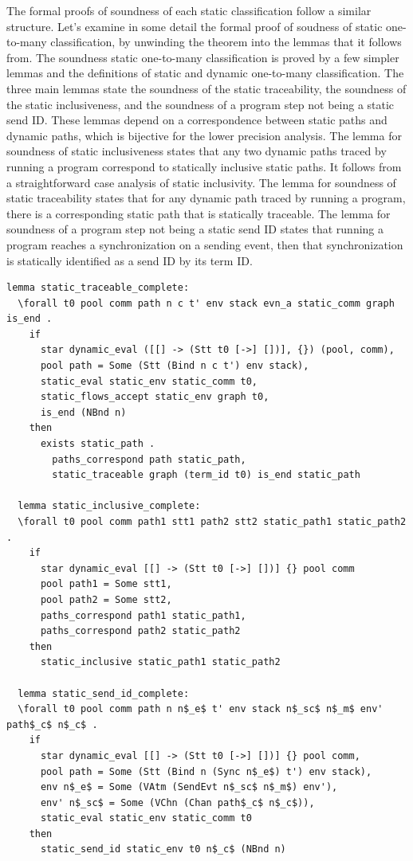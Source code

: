 \documentclass[10pt]{article}
\begin{document}
The formal proofs of soundness of each static classification follow a similar structure.
Let's examine in some detail the formal proof of soudness of static one-to-many classification,
by unwinding the theorem into the lemmas that it follows from.
The soundness static one-to-many classification is proved by a few simpler lemmas and the
definitions of static and dynamic one-to-many classification.  The three main lemmas state the
soundness of the static traceability, the soundness of the static inclusiveness, and
the soundness of a program step not being a static send ID. These lemmas depend on a
correspondence between static paths and dynamic paths, which is bijective for the lower
precision analysis. The lemma for soundness of static inclusiveness states that any two
dynamic paths traced by running a program correspond to statically inclusive static paths. It
follows from a straightforward case analysis of static inclusivity. The lemma for soundness of
static traceability states that for any dynamic path traced by running a program, there
is a corresponding static path that is statically traceable. The lemma for soundness of a
program step not being a static send ID states that running a program reaches a
synchronization on a sending event, then that synchronization is statically identified as a
send ID by its term ID.

\begin{lstlisting}[language=logic, mathescape]
  lemma static_traceable_complete:
  \forall t0 pool comm path n c t' env stack evn_a static_comm graph is_end .
    if
      star dynamic_eval ([[] -> (Stt t0 [->] [])], {}) (pool, comm), 
      pool path = Some (Stt (Bind n c t') env stack),
      static_eval static_env static_comm t0,
      static_flows_accept static_env graph t0,
      is_end (NBnd n)
    then
      exists static_path . 
        paths_correspond path static_path, 
        static_traceable graph (term_id t0) is_end static_path

  lemma static_inclusive_complete:
  \forall t0 pool comm path1 stt1 path2 stt2 static_path1 static_path2 . 
    if
      star dynamic_eval [[] -> (Stt t0 [->] [])] {} pool comm
      pool path1 = Some stt1, 
      pool path2 = Some stt2, 
      paths_correspond path1 static_path1, 
      paths_correspond path2 static_path2
    then
      static_inclusive static_path1 static_path2

  lemma static_send_id_complete:
  \forall t0 pool comm path n n$_e$ t' env stack n$_sc$ n$_m$ env' path$_c$ n$_c$ .
    if
      star dynamic_eval [[] -> (Stt t0 [->] [])] {} pool comm, 
      pool path = Some (Stt (Bind n (Sync n$_e$) t') env stack), 
      env n$_e$ = Some (VAtm (SendEvt n$_sc$ n$_m$) env'), 
      env' n$_sc$ = Some (VChn (Chan path$_c$ n$_c$)), 
      static_eval static_env static_comm t0
    then 
      static_send_id static_env t0 n$_c$ (NBnd n)
\end{lstlisting}
\end{document}
